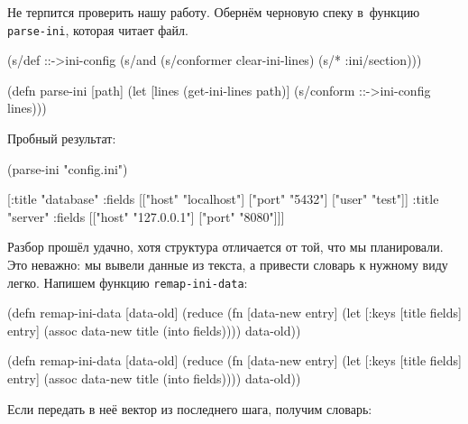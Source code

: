 Не терпится проверить нашу работу. Обернём черновую спеку в~функцию
\verb|parse-ini|, которая читает файл.

\begin{english}
  \begin{clojure}
(s/def ::->ini-config
  (s/and
   (s/conformer clear-ini-lines)
   (s/* :ini/section)))

(defn parse-ini [path]
  (let [lines (get-ini-lines path)]
    (s/conform ::->ini-config lines)))
  \end{clojure}
\end{english}

\noindent
Пробный результат:

\begin{english}
  \begin{clojure}
(parse-ini "config.ini")

[{:title "database"
  :fields [["host" "localhost"]
           ["port" "5432"]
           ["user" "test"]]}
 {:title "server"
  :fields [["host" "127.0.0.1"]
           ["port" "8080"]]}]
  \end{clojure}
\end{english}

Разбор прошёл удачно, хотя структура отличается от той, что мы планировали. Это
неважно: мы вывели данные из текста, а привести словарь к нужному виду
легко. Напишем функцию \verb|remap-ini-data|:

\ifx\devicetype\mobile

\begin{english}
  \begin{clojure}
(defn remap-ini-data [data-old]
  (reduce
   (fn [data-new entry]
     (let [{:keys [title fields]} entry]
       (assoc data-new
         title (into {} fields))))
   {}
   data-old))
  \end{clojure}
\end{english}

\else

\begin{english}
  \begin{clojure}
(defn remap-ini-data [data-old]
  (reduce
   (fn [data-new entry]
     (let [{:keys [title fields]} entry]
       (assoc data-new title (into {} fields))))
   {}
   data-old))
  \end{clojure}
\end{english}

\fi

\noindent
Если передать в неё вектор из последнего шага, получим словарь:

